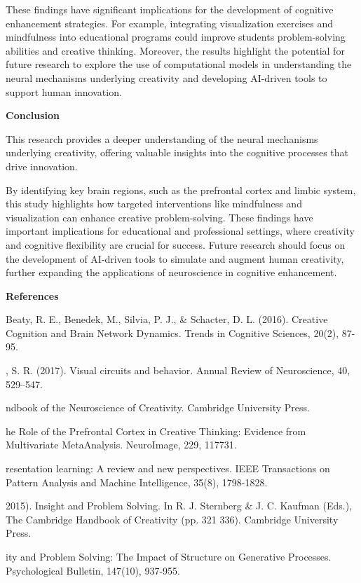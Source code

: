 \documentclass[
]{article}
\begin{document}
These findings have significant implications for the development of
cognitive\\
enhancement strategies. For example, integrating visualization exercises
and\\
mindfulness into educational programs could improve
students\textquotesingle{} problem-solving abilities and creative
thinking. Moreover, the results highlight the potential for future
research to explore the use of computational models in understanding the
neural mechanisms underlying creativity and developing AI-driven tools
to support human innovation.

\textbf{Conclusion}

This research provides a deeper understanding of the neural mechanisms
underlying creativity, offering valuable insights into the cognitive
processes that drive innovation.

By identifying key brain regions, such as the prefrontal cortex and
limbic system, this study highlights how targeted interventions like
mindfulness and visualization can enhance creative problem-solving.
These findings have important implications for educational and
professional settings, where creativity and cognitive flexibility are
crucial for success. Future research should focus on the development of
AI-driven tools to simulate and augment human creativity, further
expanding the applications of neuroscience in cognitive enhancement.

\textbf{References}

Beaty, R. E., Benedek, M., Silvia, P. J., \& Schacter, D. L. (2016).
Creative Cognition and Brain Network Dynamics. Trends in Cognitive
Sciences, 20(2), 87-95.

, S. R. (2017). Visual circuits and behavior. Annual Review of
Neuroscience, 40, 529--547.

ndbook of the Neuroscience of Creativity. Cambridge University Press.

he Role of the Prefrontal Cortex in Creative Thinking: Evidence from
Multivariate MetaAnalysis. NeuroImage, 229, 117731.

resentation learning: A review and new perspectives. IEEE Transactions
on Pattern Analysis and Machine Intelligence, 35(8), 1798-1828.

2015). Insight and Problem Solving. In R. J. Sternberg \& J. C. Kaufman
(Eds.), The Cambridge Handbook of Creativity (pp. 321 336). Cambridge
University Press.

ity and Problem Solving: The Impact of Structure on Generative
Processes. Psychological Bulletin, 147(10), 937-955.
\end{document}

